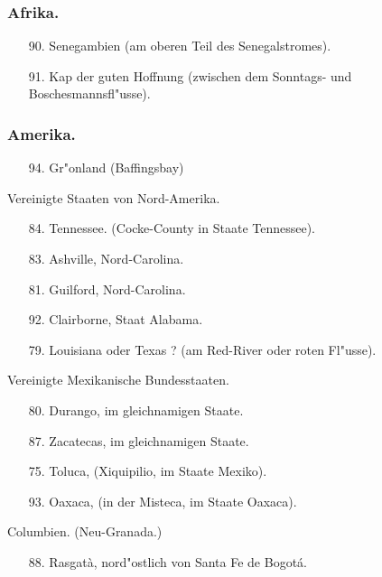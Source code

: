 \documentclass[a4paper, 11pt, oneside, polutonikogreek, german]{article}
\begin{document}
\subsubsection{Afrika.}
\begin{itemize}
    \small
    \item[90.] Senegambien (am oberen Teil des Senegalstromes).
    \item[91.] Kap der guten Hoffnung (zwischen dem Sonntags- und Boschesmannsfl"usse).
\end{itemize}
\subsubsection{Amerika.}
\begin{itemize}
    \small
    \item[94.] Gr"onland (Baffingsbay)
\end{itemize}
\begin{center}
Vereinigte Staaten von Nord-Amerika.
\end{center}
\begin{itemize}
    \small
    \item[84.] Tennessee. (Cocke-County in Staate Tennessee).
    \item[83.] Ashville, Nord-Carolina.
    \item[81.] Guilford, Nord-Carolina.
    \item[92.] Clairborne, Staat Alabama.
    \item[79.] Louisiana oder Texas ? (am Red-River oder roten Fl"usse). 
\end{itemize}
\begin{center}
Vereinigte Mexikanische Bundesstaaten.
\end{center}
\begin{itemize}
    \small
    \item[80.] Durango, im gleichnamigen Staate.
    \item[87.] Zacatecas, im gleichnamigen Staate.
    \item[75.] Toluca, (Xiquipilio, im Staate Mexiko).
    \item[93.] Oaxaca, (in der Misteca, im Staate Oaxaca).
\end{itemize}
\begin{center}
Columbien. (Neu-Granada.)
\end{center}
\begin{itemize}
    \small
    \item[88.] Rasgatà, nord"ostlich von Santa Fe de Bogotá.
\end{itemize}
\end{document}

